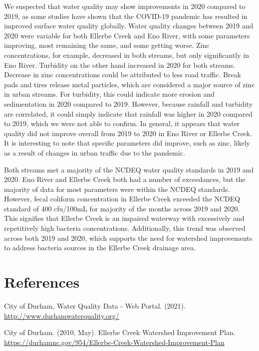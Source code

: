 \documentclass[
  12pt,
]{article}
\begin{document}
We suspected that water quality may show improvements in 2020 compared
to 2019, as some studies have shown that the COVID-19 pandemic has
resulted in improved surface water quality globally. Water quality
changes between 2019 and 2020 were variable for both Ellerbe Creek and
Eno River, with some parameters improving, most remaining the same, and
some getting worse. Zinc concentrations, for example, decreased in both
streams, but only significantly in Eno River. Turbidity on the other
hand increased in 2020 for both streams. Decrease in zinc concentrations
could be attributed to less road traffic. Break pads and tires release
metal particles, which are considered a major source of zinc in urban
streams. For turbidity, this could indicate more erosion and
sedimentation in 2020 compared to 2019. However, because rainfall and
turbidity are correlated, it could simply indicate that rainfall was
higher in 2020 compared to 2019, which we were not able to confirm. In
general, it appears that water quality did not improve overall from 2019
to 2020 in Eno River or Ellerbe Creek. It is interesting to note that
specific parameters did improve, such as zinc, likely as a result of
changes in urban traffic due to the pandemic.

Both streams met a majority of the NCDEQ water quality standards in 2019
and 2020. Eno River and Ellerbe Creek both had a number of exceedances,
but the majority of data for most parameters were within the NCDEQ
standards. However, fecal coliform concentration in Ellerbe Creek
exceeded the NCDEQ standard of 400 cfu/100mL for majority of the months
across 2019 and 2020. This signifies that Ellerbe Creek is an impaired
waterway with excessively and repetitively high bacteria concentrations.
Additionally, this trend was observed across both 2019 and 2020, which
supports the need for watershed improvements to address bacteria sources
in the Ellerbe Creek drainage area.

\newpage

\hypertarget{references}{%
\section{References}\label{references}}

City of Durham, Water Quality Data - Web Portal. (2021).
\url{http://www.durhamwaterquality.org/}

City of Durham. (2010, May). Ellerbe Creek Watershed Improvement Plan.
\url{https://durhamnc.gov/954/Ellerbe-Creek-Watershed-Improvement-Plan}
\end{document}
